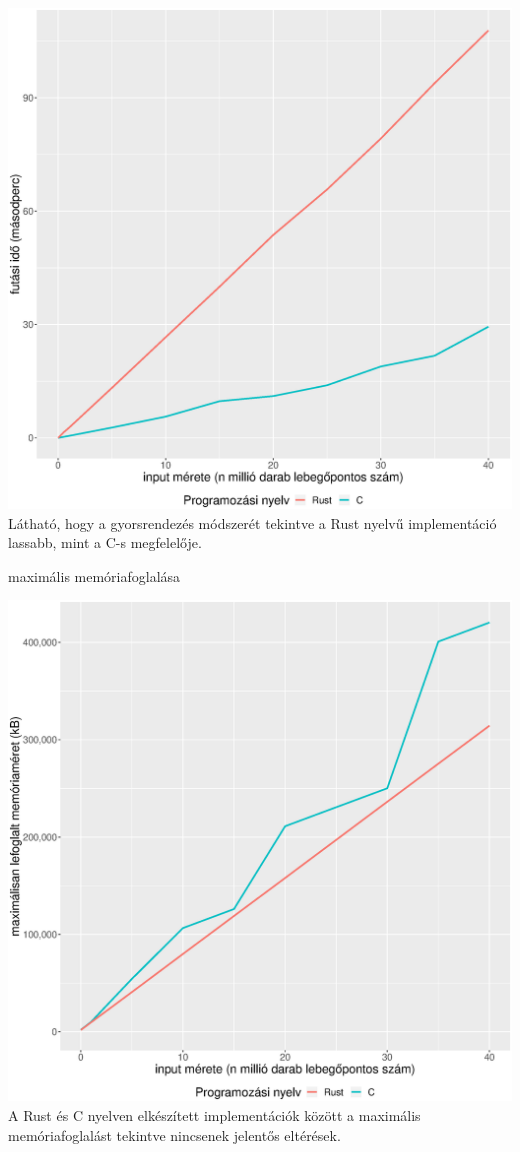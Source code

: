 \includegraphics[width=15.5cm]{kepek/quicksort_run.eps}
Látható, hogy a gyorsrendezés módszerét tekintve a Rust nyelvű implementáció lassabb, mint a C-s megfelelője.

 maximális memóriafoglalása

\includegraphics[width=15.5cm]{kepek/quicksort_memory.eps}
A Rust és C nyelven elkészített implementációk között a maximális memóriafoglalást tekintve nincsenek jelentős eltérések.

